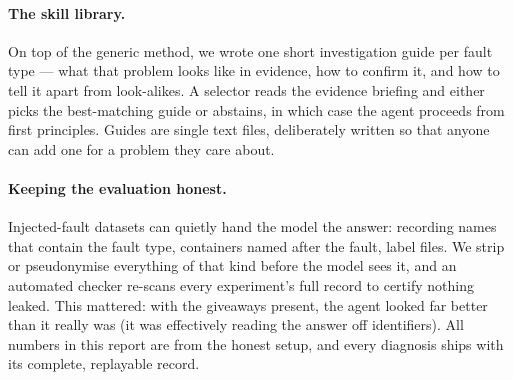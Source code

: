 \paragraph{The skill library.} On top of the generic method, we wrote one short
investigation guide per fault type --- what that problem looks like in evidence, how
to confirm it, and how to tell it apart from look-alikes. A selector reads the
evidence briefing and either picks the best-matching guide or abstains, in which case
the agent proceeds from first principles. Guides are single text files, deliberately
written so that anyone can add one for a problem they care about.

\paragraph{Keeping the evaluation honest.} Injected-fault datasets can quietly hand
the model the answer: recording names that contain the fault type, containers named
after the fault, label files. We strip or pseudonymise everything of that kind before
the model sees it, and an automated checker re-scans every experiment's full record to
certify nothing leaked. This mattered: with the giveaways present, the agent looked
far better than it really was (it was effectively reading the answer off identifiers).
All numbers in this report are from the honest setup, and every diagnosis ships with
its complete, replayable record.
